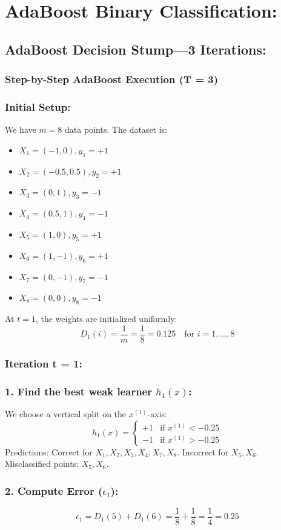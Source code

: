 \documentclass[twoside, 10pt]{article}
\begin{document}
\section{AdaBoost Binary Classification:}
\subsection{AdaBoost Decision Stump---3 Iterations:}
\subsubsection{Step-by-Step AdaBoost Execution (T = 3)}
\subsubsection*{Initial Setup:}
We have $m = 8$ data points. The dataset is:
\begin{itemize}
    \item $X_1 = (-1, 0), y_1 = +1$
    \item $X_2 = (-0.5, 0.5), y_2 = +1$
    \item $X_3 = (0, 1), y_3 = -1$
    \item $X_4 = (0.5, 1), y_4 = -1$
    \item $X_5 = (1, 0), y_5 = +1$
    \item $X_6 = (1, -1), y_6 = +1$
    \item $X_7 = (0, -1), y_7 = -1$
    \item $X_8 = (0, 0), y_8 = -1$
\end{itemize}
At $t=1$, the weights are initialized uniformly:
\[
D_1(i) = \frac{1}{m} = \frac{1}{8} = 0.125 \quad \text{for } i=1, \dots, 8
\]
\subsubsection{Iteration t = 1:}
\subsubsection*{1. Find the best weak learner $h_1(x)$:}
We choose a vertical split on the $x^{(1)}$-axis: 
\[
h_1(x) = \begin{cases} 
+1 & \text{if } x^{(1)} < -0.25 \\ 
-1 & \text{if } x^{(1)} > -0.25 
\end{cases}
\]
Predictions: Correct for $X_1, X_2, X_3, X_4, X_7, X_8$. Incorrect for $X_5, X_6$. \\
Misclassified points: $X_5, X_6$.
\subsubsection*{2. Compute Error ($\epsilon_1$):}
\[
\epsilon_1 = D_1(5) + D_1(6) = \frac{1}{8} + \frac{1}{8} = \frac{1}{4} = 0.25
\]
\end{document}
